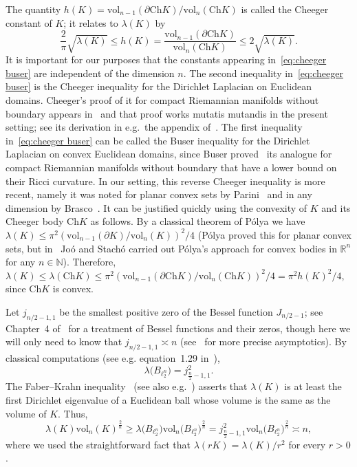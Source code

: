 \documentclass[11pt,reqno]{amsart}
\renewcommand{\le}{\leqslant}
\renewcommand{\ge}{\geqslant}
\newcommand{\R}{\mathbb R}
\theoremstyle{remark}
\newcommand{\N}{\mathbb N}
\newcommand{\Ch}{\mathrm{Ch}}
\newcommand{\vol}{\mathrm{vol}}
\renewcommand{\1}{\mathbf 1}
\begin{document}
The quantity $h(K)=\vol_{n-1}(\partial \Ch K)/\vol_n(\Ch K)$ is called the Cheeger constant of $K$; it relates  to $\lambda(K)$ by
\begin{equation}\label{eq:cheeger buser}
 \frac{2}{\pi}\sqrt{\lambda(K)}\le h(K)=\frac{\vol_{n-1}(\partial \Ch K)}{\vol_n(\Ch K)}\le 2\sqrt{\lambda(K)}.
\end{equation}
It is important for our purposes  that the constants appearing in~\eqref{eq:cheeger buser} are independent of the dimension $n$.
The second inequality in~\eqref{eq:cheeger buser} is the Cheeger inequality for the Dirichlet Laplacian on Euclidean domains. Cheeger's proof  of it for compact Riemannian manifolds without boundary appears in~\cite{Che70} and that proof works mutatis mutandis in the present setting; see its derivation in e.g.~the appendix of~\cite{LW97}. The first inequality in~\eqref{eq:cheeger buser} can be called the Buser inequality for  the Dirichlet Laplacian on convex Euclidean domains, since Buser proved~\cite{Bus82} its analogue for compact Riemannian manifolds without boundary that have a lower bound on their Ricci curvature. In our setting, this reverse Cheeger inequality is more recent, namely it was noted for planar convex sets by Parini~\cite{Par17} and in any dimension  by Brasco~\cite{Bra20}. It can be justified quickly  using  the convexity of $K$ and its Cheeger body $\Ch K$ as follows. By a classical theorem of P\'olya we have $\lambda(K)\le \pi^2 (\vol_{n-1}(\partial K)/\vol_n(K))^2/4$ (P\'olya  proved this for planar convex sets, but in~\cite{JP82}  Jo\'o and Stach\'o carried out P\'olya's approach for convex bodies in $\R^n$ for any $n\in \N$). Therefore,  $\lambda(K)\le \lambda(\Ch K)\le \pi^2 (\vol_{n-1}(\partial \Ch K)/\vol_n(\Ch K))^2/4=\pi^2 h(K)^2/4$, since $\Ch K$ is convex.

Let $j_{n/2-1,1}$ be the smallest positive zero of the Bessel function $J_{n/2-1}$; see Chapter~4 of~\cite{AAR99} for a treatment of Bessel functions and their zeros, though here we will only need to know that $j_{n/2-1,1}\asymp n$ (see~\cite{Tri49} for more precise asymptotics). By classical computations (see e.g. equation~1.29 in~\cite{Hen06}), $$\lambda\big(B_{\ell_2^n}\big)=j_{\frac{n}{2}-1,1}^2.$$
The Faber--Krahn inequality~\cite{Fab23,Kra26} (see also e.g.~\cite{PS51,Cha84}) asserts that $\lambda(K)$ is at least the first Dirichlet eigenvalue of a Euclidean ball whose volume is the same as the volume of $K$. Thus,
$$
\lambda(K)\vol_n(K)^{\frac{2}{n}}\ge \lambda\big(B_{\ell_2^n}\big)\vol_n\big(B_{\ell_2^n}\big)^{\frac{2}{n}}= j_{\frac{n}{2}-1,1}^2 \vol_n\big(B_{\ell_2^n}\big)^{\frac{2}{n}} \asymp n,
$$
where we used the straightforward fact that $\lambda(r K)=\lambda(K)/r^2$ for every $r>0$.
\end{document}
